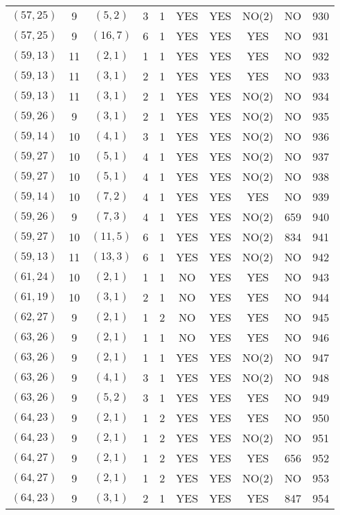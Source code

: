 \begin{longtable}{|c|c|c|c|c|c|c|c|c|c|}
$(57, 25)$ & 9 & $(5, 2)$ & 3 & 1 & YES & YES & NO(2) & NO & 930\\
$(57, 25)$ & 9 & $(16, 7)$ & 6 & 1 & YES & YES & YES & NO & 931\\
$(59, 13)$ & 11 & $(2, 1)$ & 1 & 1 & YES & YES & YES & NO & 932\\
$(59, 13)$ & 11 & $(3, 1)$ & 2 & 1 & YES & YES & YES & NO & 933\\
$(59, 13)$ & 11 & $(3, 1)$ & 2 & 1 & YES & YES & NO(2) & NO & 934\\
$(59, 26)$ & 9 & $(3, 1)$ & 2 & 1 & YES & YES & NO(2) & NO & 935\\
$(59, 14)$ & 10 & $(4, 1)$ & 3 & 1 & YES & YES & NO(2) & NO & 936\\
$(59, 27)$ & 10 & $(5, 1)$ & 4 & 1 & YES & YES & NO(2) & NO & 937\\
$(59, 27)$ & 10 & $(5, 1)$ & 4 & 1 & YES & YES & NO(2) & NO & 938\\
$(59, 14)$ & 10 & $(7, 2)$ & 4 & 1 & YES & YES & YES & NO & 939\\
$(59, 26)$ & 9 & $(7, 3)$ & 4 & 1 & YES & YES & NO(2) & 659 & 940\\
$(59, 27)$ & 10 & $(11, 5)$ & 6 & 1 & YES & YES & NO(2) & 834 & 941\\
$(59, 13)$ & 11 & $(13, 3)$ & 6 & 1 & YES & YES & NO(2) & NO & 942\\
$(61, 24)$ & 10 & $(2, 1)$ & 1 & 1 & NO & YES & YES & NO & 943\\
$(61, 19)$ & 10 & $(3, 1)$ & 2 & 1 & NO & YES & YES & NO & 944\\
$(62, 27)$ & 9 & $(2, 1)$ & 1 & 2 & NO & YES & YES & NO & 945\\
$(63, 26)$ & 9 & $(2, 1)$ & 1 & 1 & NO & YES & YES & NO & 946\\
$(63, 26)$ & 9 & $(2, 1)$ & 1 & 1 & YES & YES & NO(2) & NO & 947\\
$(63, 26)$ & 9 & $(4, 1)$ & 3 & 1 & YES & YES & NO(2) & NO & 948\\
$(63, 26)$ & 9 & $(5, 2)$ & 3 & 1 & YES & YES & YES & NO & 949\\
$(64, 23)$ & 9 & $(2, 1)$ & 1 & 2 & YES & YES & YES & NO & 950\\
$(64, 23)$ & 9 & $(2, 1)$ & 1 & 2 & YES & YES & NO(2) & NO & 951\\
$(64, 27)$ & 9 & $(2, 1)$ & 1 & 2 & YES & YES & YES & 656 & 952\\
$(64, 27)$ & 9 & $(2, 1)$ & 1 & 2 & YES & YES & NO(2) & NO & 953\\
$(64, 23)$ & 9 & $(3, 1)$ & 2 & 1 & YES & YES & YES & 847 & 954\\

\end{longtable}
